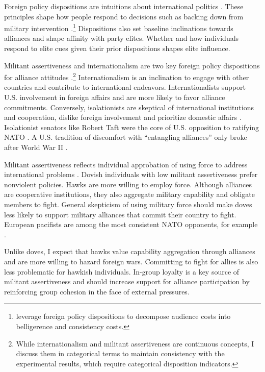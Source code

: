\documentclass[12pt]{article}
\begin{document}
Foreign policy dispositions are intuitions about international politics \citep{KertzerTingley2018}. 
These principles shape how people respond to decisions such as backing down from military intervention \citep{KertzerBrutger2016}.\footnote{\citet{KertzerBrutger2016} leverage foreign policy dispositions to decompose audience costs into belligerence and consistency costs.}
Dispositions also set baseline inclinations towards alliances and shape affinity with party elites.
Whether and how individuals respond to elite cues given their prior dispositions shapes elite influence. 


Militant assertiveness and internationalism are two key foreign policy dispositions for alliance attitudes \citep{Herrmannetal1999}.\footnote{While internationalism and militant assertiveness are continuous concepts, I discuss them in categorical terms to maintain consistency with the experimental results, which require categorical disposition indicators.}
Internationalism is an inclination to engage with other countries and contribute to international endeavors. 
Internationalists support U.S. involvement in foreign affairs and are more likely to favor alliance commitments. 
Conversely, isolationists are skeptical of international institutions and cooperation, dislike foreign involvement and prioritize domestic affairs \citep{Kertzer2013}. 
Isolationist senators like Robert Taft were the core of U.S. opposition to ratifying NATO \citep{Kaplan2007}.
A U.S. tradition of discomfort with ``entangling alliances'' only broke after World War II \citep{Kupchan2020}.


Militant assertiveness reflects individual approbation of using force to address international problems \citep{Herrmannetal1999}. 
Dovish individuals with low militant assertiveness prefer nonviolent policies.
Hawks are more willing to employ force.
Although alliances are cooperative institutions, they also aggregate military capability and obligate members to fight.
General skepticism of using military force should make doves less likely to support military alliances that commit their country to fight.  
European pacifists are among the most consistent NATO opponents, for example \citep{Thies2015}.


Unlike doves, I expect that hawks value capability aggregation through alliances and are more willing to hazard foreign wars. 
Committing to fight for allies is also less problematic for hawkish individuals. 
In-group loyalty is a key source of militant assertiveness \citep{Kertzeretal2014} and should increase support for alliance participation by reinforcing group cohesion in the face of external pressures.
\end{document}
